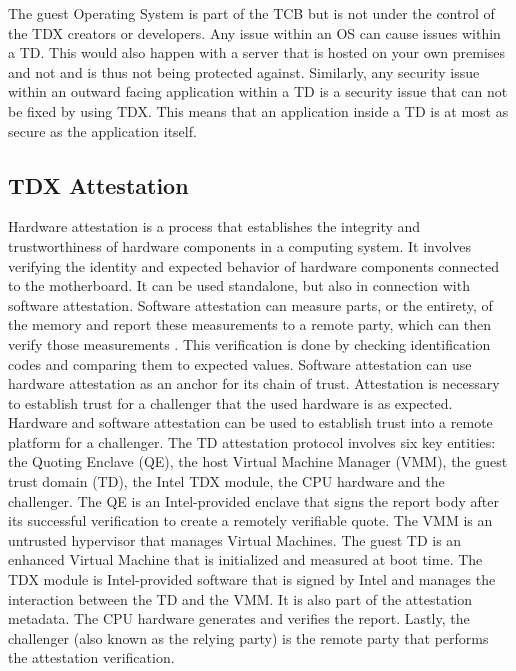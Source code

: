 
The guest Operating System is part of the \Gls{TCB} but is not under the control of the TDX creators or developers. Any issue within an \Gls{OS} can cause issues within a \Gls{TD}. This would also happen with a server that is hosted on your own premises and not  and is thus not being protected against. Similarly, any security issue within an outward facing application within a \Gls{TD} is a security issue that can not be fixed by using TDX. This means that an application inside a TD is at most as secure as the application itself. 


\subsection{TDX Attestation}
\label{TDX attestation}
Hardware attestation is a process that establishes the integrity and trustworthiness of hardware components in a computing system. It involves verifying the identity and expected behavior of hardware components connected to the motherboard. It can be used standalone, but also in connection with software attestation. Software attestation can measure parts, or the entirety, of the memory and report these measurements to a remote party, which can then verify those measurements \cite{stumpf}. This verification is done by checking identification codes and comparing them to expected values. Software attestation can use hardware attestation as an anchor for its chain of trust. Attestation is necessary to establish trust for a challenger that the used hardware is as expected. Hardware and software attestation can be used to establish trust into a remote platform for a challenger.
The TD attestation protocol involves six key entities: the Quoting Enclave (QE), the host Virtual Machine Manager (VMM), the guest trust domain (TD), the Intel TDX module, the CPU hardware and the challenger. The QE is an Intel-provided enclave that signs the report body after its successful verification to create a remotely verifiable quote. The VMM is an untrusted hypervisor that manages Virtual Machines. The guest TD is an enhanced Virtual Machine that is initialized and measured at boot time. The TDX module is Intel-provided software that is signed by Intel and manages the interaction between the TD and the VMM. It is also part of the attestation metadata. The CPU hardware generates and verifies the report. Lastly, the challenger (also known as the relying party) is the remote party that performs the attestation verification.


